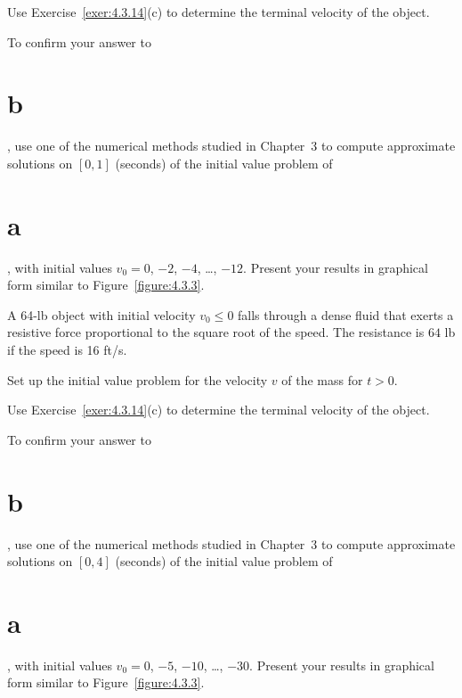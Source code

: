 \begin{exerciselist}
\begin{alist}
    \item %
    Use Exercise~\ref{exer:4.3.14}(c) to determine the terminal velocity of the object.

    \item %
    \Cex To confirm your answer to \part{b}, use one of the numerical methods studied in Chapter~3
    to compute approximate solutions on $[0,1]$ (seconds) of the initial value problem of \part{a},
    with initial values $v_{0}=0$, $-2$, $-4$, \dots, $-12$. Present your results in graphical form
    similar to Figure~\ref{figure:4.3.3}.
  \end{alist}

  \item\label{exer:4.3.16} A 64-lb object with initial velocity $v_{0}\le0$ falls through a dense
        fluid that exerts a resistive force proportional to the square root of the speed. The
        resistance is $64$ lb if the speed is 16 ft/s.

  \begin{alist}
    \item %
    Set up the initial value problem for the velocity $v$ of the mass for $t>0$.

    \item %
    Use Exercise~\ref{exer:4.3.14}(c) to determine the terminal velocity of the object.

    \item %
    \Cex To confirm your answer to \part{b}, use one of the numerical methods studied in Chapter~3
    to compute approximate solutions on $[0,4]$ (seconds) of the initial value problem of \part{a},
    with initial values $v_{0}=0$, $-5$, $-10$, \dots, $-30$. Present your results in graphical form
    similar to Figure~\ref{figure:4.3.3}.
  \end{alist}



\end{exerciselist}
